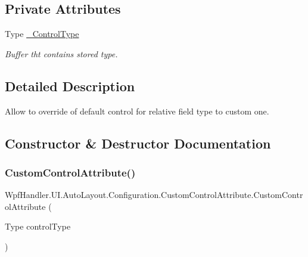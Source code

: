 \subsection*{Private Attributes}
\begin{DoxyCompactItemize}
\item 
Type \mbox{\hyperlink{class_wpf_handler_1_1_u_i_1_1_auto_layout_1_1_configuration_1_1_custom_control_attribute_a3099e2b45323143744f788f5f9db22ab}{\+\_\+\+Control\+Type}}
\begin{DoxyCompactList}\small\item\em Buffer tht contains stored type. \end{DoxyCompactList}\end{DoxyCompactItemize}


\subsection{Detailed Description}
Allow to override of default control for relative field type to custom one. 



\subsection{Constructor \& Destructor Documentation}
\mbox{\label{class_wpf_handler_1_1_u_i_1_1_auto_layout_1_1_configuration_1_1_custom_control_attribute_a7a46691a6fae1c36fb9812923e90cf8a}} 
\subsubsection{\texorpdfstring{Custom\+Control\+Attribute()}{CustomControlAttribute()}}
{\footnotesize\ttfamily Wpf\+Handler.\+U\+I.\+Auto\+Layout.\+Configuration.\+Custom\+Control\+Attribute.\+Custom\+Control\+Attribute (\begin{DoxyParamCaption}\item[{Type}]{control\+Type }\end{DoxyParamCaption})}



